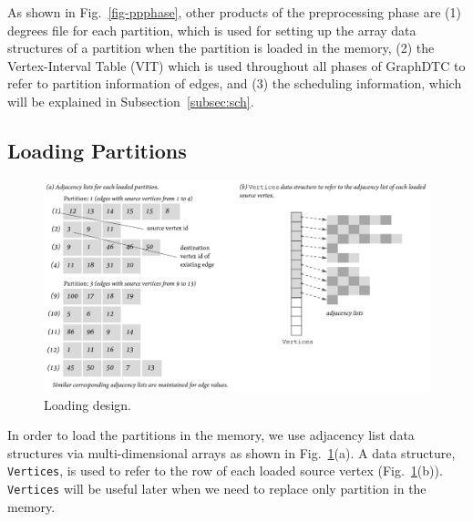 \documentclass[10pt,preprint]{sigplanconf}
\begin{document}
As shown in Fig.~\ref{fig-ppphase}, other products of the preprocessing phase are (1) degrees file for each partition, which is used for setting up the array data structures of a partition when the partition is loaded in the memory, (2) the Vertex-Interval Table (VIT) which is used throughout all phases of GraphDTC to refer to partition information of edges, and (3) the scheduling information, which will be explained in Subsection~\ref{subsec:sch}.

\subsection{Loading Partitions}
\label{subsec:loadingparts}

\begin{figure}[!htbp]
	\begin{center}
		\includegraphics[scale=0.58]{Figures/lddesign.pdf}
	\end{center}
	\caption{Loading design.}
	\label{fig-lddesign}
\end{figure}

In order to load the partitions in the memory, we use adjacency list data structures via multi-dimensional arrays as shown in Fig.~\ref{fig-lddesign}(a). A data structure, \texttt{Vertices}, is used to refer to the row of each loaded source vertex (Fig.~\ref{fig-lddesign}(b)). \texttt{Vertices} will be useful later when we need to replace only partition in the memory. 
\end{document}
